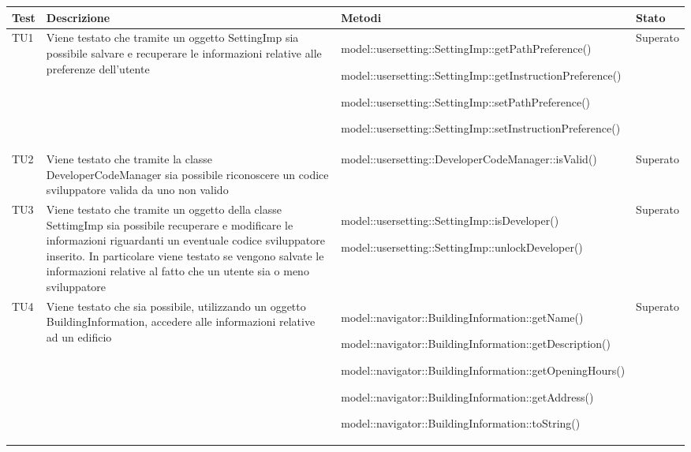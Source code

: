 \documentclass[../PianoDiQualifica.tex]{subfiles}
\begin{document}
\begin{appendices}
\begin{longtabu}to \textwidth {X[0.6] X[2] X[3.2] X[0.8]}
\toprule
\textbf{Test} & \textbf{Descrizione} & \textbf{Metodi} & \textbf{Stato}\\
\midrule
\endhead
{}
TU1 & Viene testato che tramite un oggetto SettingImp sia possibile salvare e recuperare le informazioni relative alle preferenze dell'utente & model::\-usersetting::\-SettingImp::\-getPathPreference() \par model::\-usersetting::\-SettingImp::\-getInstructionPreference() \par model::\-usersetting::\-SettingImp::\-setPathPreference() \par model::\-usersetting::\-SettingImp::\-setInstructionPreference() & Superato \\ 
\midrule 
TU2 & Viene testato che tramite la classe DeveloperCodeManager sia possibile riconoscere un codice sviluppatore valida da uno non valido & model::\-usersetting::\-DeveloperCodeManager::\-isValid() & Superato \\ 
\midrule 
TU3 & Viene testato che tramite un oggetto della classe SettimgImp sia possibile recuperare e modificare le informazioni riguardanti un eventuale codice sviluppatore inserito. In particolare viene testato se vengono salvate le informazioni relative al fatto che un utente sia o meno sviluppatore & model::\-usersetting::\-SettingImp::\-isDeveloper() \par model::\-usersetting::\-SettingImp::\-unlockDeveloper() & Superato \\ 
\midrule 
TU4 & Viene testato che sia possibile, utilizzando un oggetto BuildingInformation, accedere alle informazioni relative ad un edificio & model::\-navigator::\-BuildingInformation::\-getName() \par model::\-navigator::\-BuildingInformation::\-getDescription() \par model::\-navigator::\-BuildingInformation::\-getOpeningHours() \par model::\-navigator::\-BuildingInformation::\-getAddress() \par model::\-navigator::\-BuildingInformation::\-toString() & Superato \\ 
\midrule 

\end{longtabu}
\end{appendices}
\end{document}
